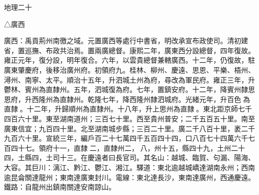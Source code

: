 
\begin{pinyinscope}
地理二十

△廣西

廣西：禹貢荊州南徼之域。元置廣西等處行中書省，明改承宣布政使司。清初建省，置巡撫、布政共治焉。置兩廣總督。康熙二年，廣東西分設總督，四年復故。雍正元年，復分設，明年復合。六年，以雲貴總督兼轄廣西。十二年，仍復故，駐廣東肇慶府，後移治廣州府。初領府九。桂林、柳州、慶遠、思恩、平樂、梧州、潯州、南寧、太平。順治十五年，升泗城土州為府，尋改為軍民府。雍正三年，升鬱林、賓州為直隸州。五年，泗城復為府。七年，置鎮安府。十二年，降賓州隸思恩府，升西隆州為直隸州。乾隆七年，降西隆州隸泗城府。光緒元年，升百色為直隸。十二年，升歸順州為直隸州。十八年，升上思州為直隸。東北距京師七千四百六十里。東至湖南道州；三百七十里。西至貴州普安；二千五百五十里。南至廣東信宜；九百四十里。北至湖南城步縣；三百二十里。廣二千八百十里，袤二千九百六十里。宣統三年，編戶百二十七萬四千五百四十四，口八百七十四萬六千七百四十七。領府十一，直隸二，直隸州二，八，州十五，縣四十九，土州二十四，土縣四，土司十三。在慶遠者曰長官司。其名山：越城、臨賀、句漏、陽海、大容。其巨川：漓江、黔江、鬱江、湘江。驛道：東北逾越城嶠達湖南永州；西南逾昆侖關達龍州；東南達廣東封川。電線：東北達長沙，東南達廣州，西通慶遠。鐵路：自龍州出鎮南關達安南諒山。


\end{pinyinscope}
